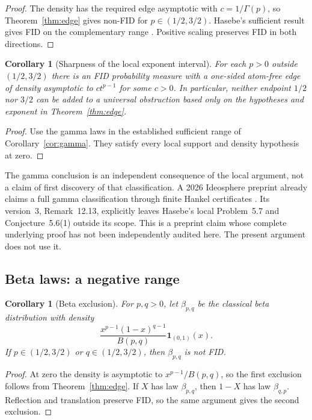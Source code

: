 \documentclass[11pt,a4paper]{article}
\newtheorem{corollary}[theorem]{Corollary}
\theoremstyle{definition}
\theoremstyle{remark}
\begin{document}
\begin{proof}
The density has the required edge asymptotic with $c=1/\Gamma(p)$,
so Theorem~\ref{thm:edge} gives non-FID for $p\in(1/2,3/2)$.
Hasebe's sufficient result gives FID on the complementary range
\cite[Corollary~1.3(1)]{Hasebe2014}. Positive scaling preserves
FID in both directions.
\end{proof}

\begin{corollary}[Sharpness of the local exponent interval]
\label{cor:sharpness}
For each $p>0$ outside $(1/2,3/2)$ there is an FID probability
measure with a one-sided atom-free edge of density asymptotic to
$ct^{p-1}$ for some $c>0$. In particular, neither endpoint $1/2$
nor $3/2$ can be added to a universal obstruction based only on
the hypotheses and exponent in Theorem~\ref{thm:edge}.
\end{corollary}

\begin{proof}
Use the gamma laws in the established sufficient range of
Corollary~\ref{cor:gamma}. They satisfy every local support and
density hypothesis at zero.
\end{proof}

The gamma conclusion is an independent consequence of the local
argument, not a claim of first discovery of that classification.
A 2026 Ideosphere preprint already claims a full gamma classification
through finite Hankel certificates \cite{IdeosphereGamma}.
Its version~3, Remark~12.13, explicitly leaves Hasebe's local
Problem~5.7 and Conjecture~5.6(1) outside its scope. This is a
preprint claim whose complete underlying proof has not been
independently audited here. The present argument does not use it.

\subsection{Beta laws: a negative range}

\begin{corollary}[Beta exclusion]\label{cor:beta}
For $p,q>0$, let $\beta_{p,q}$ be the classical beta distribution
with density
\[
 \frac{x^{p-1}(1-x)^{q-1}}{B(p,q)}\mathbf1_{(0,1)}(x).
\]
If $p\in(1/2,3/2)$ or $q\in(1/2,3/2)$, then $\beta_{p,q}$
is not FID.
\end{corollary}

\begin{proof}
At zero the density is asymptotic to $x^{p-1}/B(p,q)$, so the
first exclusion follows from Theorem~\ref{thm:edge}. If $X$ has
law $\beta_{p,q}$, then $1-X$ has law $\beta_{q,p}$. Reflection
and translation preserve FID, so the same argument gives the
second exclusion.
\end{proof}
\end{document}
